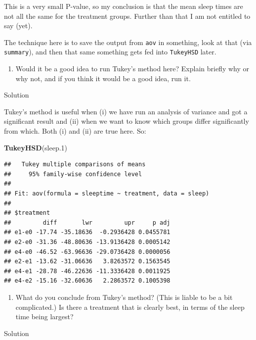\documentclass[]{tufte-book}
\newenvironment{Shaded}{}{}
\newcommand{\FloatTok}[1]{\textcolor[rgb]{0.25,0.63,0.44}{#1}}
\newcommand{\KeywordTok}[1]{\textcolor[rgb]{0.00,0.44,0.13}{\textbf{#1}}}
\newcommand{\NormalTok}[1]{#1}
\providecommand{\tightlist}{%
  \setlength{\itemsep}{0pt}\setlength{\parskip}{0pt}}
\theoremstyle{definition}
\theoremstyle{definition}
\theoremstyle{definition}
\theoremstyle{remark}
\begin{document}
This is a very small P-value, so my conclusion is that the mean sleep
times are not all the same for the treatment groups. Further than that I
am not entitled to say (yet).

The technique here is to save the output from \texttt{aov} in something,
look at that (via \texttt{summary}), and then that same something gets
fed into \texttt{TukeyHSD} later.

\begin{enumerate}
\def\labelenumi{(\alph{enumi})}
\setcounter{enumi}{6}
\tightlist
\item
  Would it be a good idea to run Tukey's method here? Explain briefly
  why or why not, and if you think it would be a good idea, run it.
\end{enumerate}

Solution

Tukey's method is useful when (i) we have run an analysis of variance
and got a significant result and (ii) when we want to know which groups
differ significantly from which. Both (i) and (ii) are true here. So:

\begin{Shaded}
\begin{Highlighting}[]
\KeywordTok{TukeyHSD}\NormalTok{(sleep}\FloatTok{.1}\NormalTok{)}
\end{Highlighting}
\end{Shaded}

\begin{verbatim}
##   Tukey multiple comparisons of means
##     95% family-wise confidence level
## 
## Fit: aov(formula = sleeptime ~ treatment, data = sleep)
## 
## $treatment
##         diff       lwr         upr     p adj
## e1-e0 -17.74 -35.18636  -0.2936428 0.0455781
## e2-e0 -31.36 -48.80636 -13.9136428 0.0005142
## e4-e0 -46.52 -63.96636 -29.0736428 0.0000056
## e2-e1 -13.62 -31.06636   3.8263572 0.1563545
## e4-e1 -28.78 -46.22636 -11.3336428 0.0011925
## e4-e2 -15.16 -32.60636   2.2863572 0.1005398
\end{verbatim}

\begin{enumerate}
\def\labelenumi{(\alph{enumi})}
\setcounter{enumi}{7}
\tightlist
\item
  What do you conclude from Tukey's method? (This is liable to be a bit
  complicated.) Is there a treatment that is clearly best, in terms of
  the sleep time being largest?
\end{enumerate}

Solution
\end{document}

